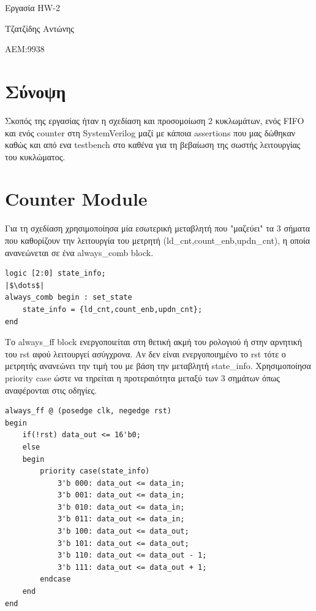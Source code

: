 \documentclass[12pt]{article}
\begin{document}
\begin{titlepage}
    \begin{center}
         \vspace*{5cm}
 
         \Huge{Εργασία HW-2}
         
        
         \vspace{3cm}
         \large{Τζατζίδης Αντώνης}
    
         \vspace{1cm}
         \large{ΑΕΜ:9938}
        
        \vfill
     \end{center}
\end{titlepage}

\section*{Σύνοψη}
Σκοπός της εργασίας ήταν η σχεδίαση και προσομοίωση 2 κυκλωμάτων, ενός FIFO και ενός counter στη SystemVerilog  μαζί με κάποια 
assertions που μας δώθηκαν καθώς και από ενα testbench στο καθένα για τη βεβαίωση της σωστής λειτουργίας του κυκλώματος.

\section*{Counter Module}
Για τη σχεδίαση χρησιμοποίησα μία εσωτερική μεταβλητή που "μαζεύει" τα 3 σήματα που καθορίζουν την λειτουργία του μετρητή 
(ld\_cnt,count\_enb,updn\_cnt), η οποία ανανεώνεται σε ένα always\_comb block.
\begin{verbatim} 
logic [2:0] state_info;
|$\dots$|
always_comb begin : set_state
    state_info = {ld_cnt,count_enb,updn_cnt};
end 
\end{verbatim}

Το always\_ff block ενεργοποιείται στη θετική ακμή του ρολογιού ή στην αρνητική του rst αφού λειτουργεί ασύγχρονα. 
Αν δεν είναι ενεργοποιημένο το rst
τότε ο μετρητής ανανεώνει την τιμή του με βάση την μεταβλητή state\_info. Χρησιμοποίησα priority case ώστε να τηρείται η προτεραιότητα
μεταξύ των 3 σημάτων όπως αναφέρονται στις οδηγίες. 
\begin{verbatim} 
always_ff @ (posedge clk, negedge rst) 
begin
    if(!rst) data_out <= 16'b0;
    else 
    begin
        priority case(state_info) 
            3'b 000: data_out <= data_in;
            3'b 001: data_out <= data_in;
            3'b 010: data_out <= data_in;
            3'b 011: data_out <= data_in;
            3'b 100: data_out <= data_out; 
            3'b 101: data_out <= data_out; 
            3'b 110: data_out <= data_out - 1;
            3'b 111: data_out <= data_out + 1;
        endcase
    end
end
\end{verbatim}
\end{document}
